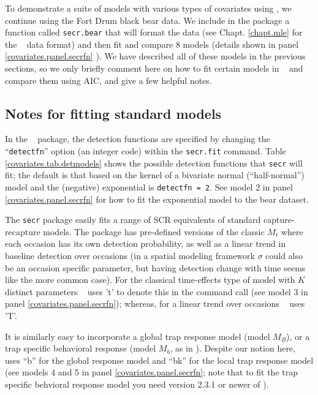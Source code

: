 To demonstrate
a suite of models with various types of covariates using \secr, we
continue using the Fort Drum black bear data.
We include in the \scrbook package a function called {\tt secr.bear}
that will format the data (see Chapt. \ref{chapt.mle} for the \secr~
data format) and then fit and compare 8 models (details shown in panel
\ref{covariates.panel.secrfn} ).  We have described all of these
models in the previous sections, so we only briefly comment here on
how to fit certain models in \secr~ and compare them using AIC, and
give a few helpful notes.

\subsection{Notes for fitting standard models}

In the \secr~ package, the detection functions are specified
by changing the ``\mbox{\tt detectfn}'' option (an integer code)
within the \mbox{\tt secr.fit} command.  Table
\ref{covariates.tab.detmodels} shows the possible detection functions
that \mbox{\tt secr} will fit; the default is that based on the kernel
of a bivariate normal
(``half-normal'') model and the
(negative) exponential is \mbox{\tt detectfn = 2}.  See model 2 in 
panel \ref{covariates.panel.secrfn} for how to fit the exponential 
model to the bear dataset. 

The \mbox{\tt secr} package easily fits a range of SCR equivalents of standard capture-recapture models.
The package has pre-defined versions of the classic
$M_{t}$ where each
occasion has its own detection probability, as well as a linear
trend in baseline detection over occasions (in a spatial modeling framework $\sigma$ could also be an occasion specific parameter, but having detection change with time seems like the more common case). For the classical
time-effects type of model with $K$ distinct parameters \secr~ uses 't' to denote
this in the command call (see model 3 in 
panel \ref{covariates.panel.secrfn}); whereas, for a linear
trend over occasions \secr~ uses 'T'.

It is similarly easy to incorporate a global trap response model (model $M_{B}$), 
or a trap specific behavioral response (model $M_{b}$, as in
\citet{royle_etal:2009}). Despite our notion here, \secr~ uses ``b'' for the global response model and
 ``bk'' for the local trap response model
(see models 4 and 5 in 
panel \ref{covariates.panel.secrfn}; note that to fit the trap specific behvioral response model you need version 2.3.1 or newer of \secr).

